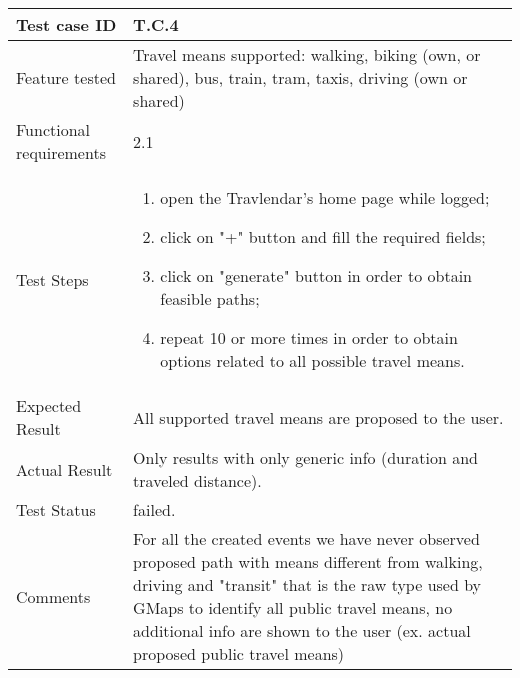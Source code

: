\begin{table}[H]
	\begin{center}
		\begin{tabular}{ | p{} | p{} | }
		\hline
		Test case ID & T.C.4\\
		\hline
		Feature tested & Travel means supported: walking, biking (own, or shared), bus, train, tram, taxis, driving (own or shared)  \\
		\hline
		Functional requirements & 2.1   \\
		\hline
		Test Steps & 
			\begin{enumerate}
				\item open the Travlendar's home page while logged;
				\item click on "+" button and fill the required fields;
				\item click on "generate" button in order to obtain feasible paths;
				\item repeat 10 or more times in order to obtain options related to all possible travel means.
			\end{enumerate} \\
		\hline
		Expected Result & All supported travel means are proposed to the user.\\
		\hline
		Actual Result & Only results with only generic info (duration and traveled distance).  \\ 
		\hline
		Test Status & \color{Red}failed.\\ 
		\hline
		Comments & For all the created events we have never observed proposed path with means different from walking, driving and "transit" that is the raw type used by GMaps to identify all public travel means, no additional info are shown to the user (ex. actual proposed public travel means) \\ 
		\hline
		\end{tabular}
	\end{center}
\end{table}

